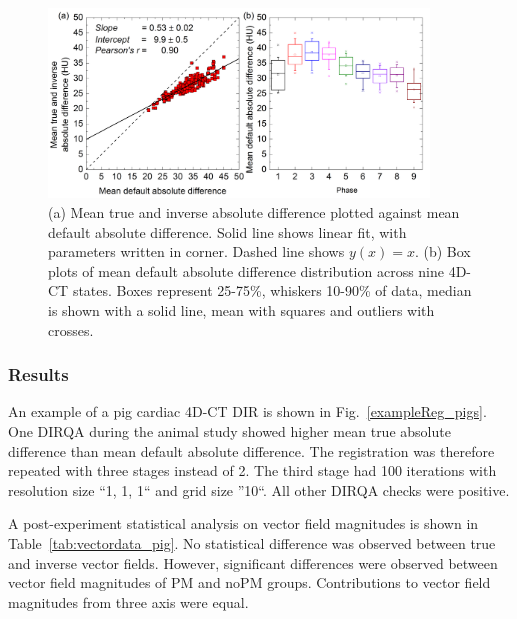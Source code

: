\documentclass[type=dr, dr=rernat, accentcolor=tud7b,colorbacktitle, bigchapter, openright, twoside, 12pt ]{tudthesis}
\begin{document}
\begin{figure}[H]
	\begin{center}		
		\includegraphics[width=0.9\textwidth]{./Images/AbsDiff_pigs.png}
		\caption{(a) Mean true and inverse absolute difference plotted against mean default absolute difference. Solid line shows linear fit, with parameters
		written in corner. Dashed line shows $y(x)=x$. (b) Box plots of mean default absolute difference distribution across nine 4D-CT states. Boxes represent 25-75\%, whiskers 10-90\%
		of data, median is shown with a solid line, mean with squares and outliers with crosses.}
		\label{absDiff_pigs}
	\end{center}
\end{figure}

\subsubsection{Results}

An example of a pig cardiac 4D-CT DIR is shown in Fig.~\ref{exampleReg_pigs}. One DIRQA during the animal study showed higher mean true absolute difference than mean default absolute difference. The registration
was therefore repeated with three stages instead of 2. The third stage had 100 iterations with resolution size ``1, 1, 1`` and grid size ''10``. All other DIRQA checks were positive.

A post-experiment statistical analysis on vector field magnitudes is shown in Table~\ref{tab:vectordata_pig}. No statistical difference was
observed between true and inverse vector fields. However, significant differences were observed between vector field magnitudes of PM and noPM groups. Contributions to vector field magnitudes from three axis were equal. 
\end{document}
